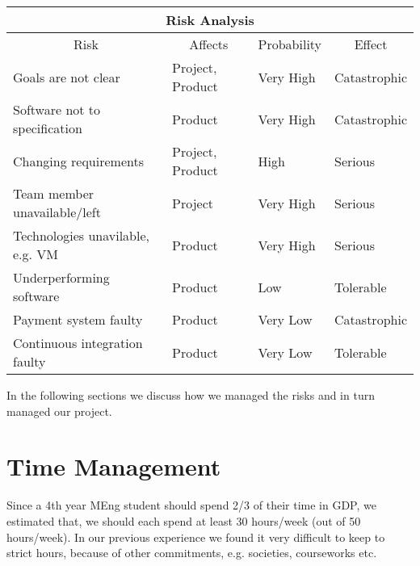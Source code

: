 \begin{center}

\begin{longtable}{ |p{5.7cm}|p{2cm}|p{2.2cm}|p{2.7cm}|  }

 \hline
 	\multicolumn{4}{|c|}{Risk Analysis} \\
 \hline
 	\multicolumn{1}{|c|}{Risk} &
 	\multicolumn{1}{|c|}{Affects} &
 	\multicolumn{1}{|c|}{Probability} &
 	\multicolumn{1}{|c|}{Effect}  \\
  \hline
 	 Goals are not clear & Project, Product & Very High & Catastrophic \\
   \hline
   Software not to specification & Product & Very High & Catastrophic \\
   \hline
   Changing requirements & Project, Product & High & Serious \\
  \hline
  Team member unavailable/left & Project & Very High & Serious \\
  \hline
  Technologies unavilable, e.g. VM & Product & Very High & Serious \\
  \hline
  Underperforming software & Product & Low & Tolerable \\
  \hline
  Payment system faulty & Product & Very Low & Catastrophic \\
  \hline
  Continuous integration faulty & Product & Very Low & Tolerable \\
  \hline

\end{longtable}

\label{tab:risk}

\end{center}

In the following sections we discuss how we managed the risks and in turn managed our project.

\section{Time Management}
\label{sec:time-management}
Since a 4th year MEng student should spend 2/3 of their time in GDP, we estimated that, we should each spend at least 30 hours/week (out of 50 hours/week). In our previous experience we found it very difficult to keep to strict hours, because of other commitments, e.g. societies, courseworks etc.\\

